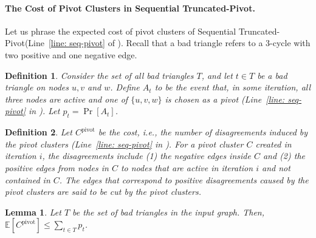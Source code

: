\documentclass[10pt,a4paper]{article}
\newtheorem{lemma}{Lemma}[section]
\newtheorem{definition}{Definition}[section]
\newcommand{\E}{\mathbb{E}}
\newcommand{\seqtruncatedpivot}{Sequential \textrm{Truncated-Pivot}\xspace}
\newcommand{\ourcluster}{\ensuremath{C^{\textrm{pivot}}}\xspace}
\begin{document}
\paragraph{The Cost of Pivot Clusters in \seqtruncatedpivot.}
Let us phrase the expected cost of pivot clusters of \seqtruncatedpivot (Line~\ref{line: seq-pivot} of ).
Recall that a bad triangle refers to a $3$-cycle with two positive and one negative edge.


\begin{definition} 
    Consider the set of all bad triangles $T$, and let $t \in T$ be a bad triangle on nodes $u, v$ and $w$.
    Define $A_t$ to be the event that, in some iteration, all three nodes are active and one of $\{u, v, w\}$ is chosen as a pivot (Line~\ref{line: seq-pivot} in ). Let $p_t = \Pr[A_t]$.
\end{definition}

\begin{definition} \label{def: pivotcost}
    Let $\ourcluster$ be the cost, i.e., the number of disagreements induced by the pivot clusters (Line~\ref{line: seq-pivot} in ). 
    For a pivot cluster $C$ created in iteration $i$, the disagreements include (1) the negative edges inside $C$ and (2) the positive edges from nodes in $C$ to nodes that are active in iteration $i$ and not contained in $C$.
    The edges that correspond to positive disagreements caused by the pivot clusters are said to be \emph{cut} by the pivot clusters.
\end{definition}


\begin{lemma}
    Let $T$ be the set of bad triangles in the input graph.
    Then, $\E[\ourcluster] \leq \sum_{t \in T} p_t$.
    \label{lemma: expected cost}
\end{lemma}
\end{document}

